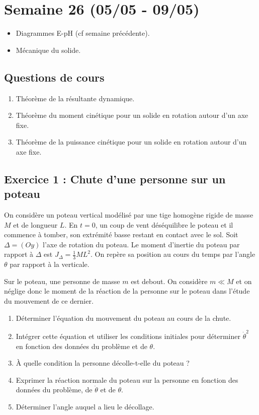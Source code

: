 \section{Semaine 26 (05/05 - 09/05) }


\begin{itemize}
	\item Diagrammes E-pH (cf semaine précédente).
	\item Mécanique du solide.
\end{itemize}

\subsection{Questions de cours}

\begin{enumerate}
	\item Théorème de la résultante dynamique.
	\item Théorème du moment cinétique pour un solide en rotation autour d'un axe fixe.
	\item Théorème de la puissance cinétique pour un solide en rotation autour d'un axe fixe.
\end{enumerate}


\subsection{Exercice 1 : Chute d'une personne sur un poteau}

On considère un poteau vertical modélisé par une tige homogène rigide de masse $M$ et de longueur $L$. En $t=0$, un coup de vent déséquilibre le poteau et il commence à tomber, son extrémité basse restant en contact avec le sol. Soit $\Delta = (Oy)$ l'axe de rotation du poteau. Le moment d'inertie du poteau par rapport à $\Delta$ est $J_{\Delta} = \frac{1}{3}ML^2$. On repère sa position au cours du temps par l'angle $\theta$ par rapport à la verticale. 

Sur le poteau, une personne de masse $m$ est debout. On considère $m \ll M$ et on néglige donc le moment de la réaction de la personne sur le poteau dans l'étude du mouvement de ce dernier. 

\begin{enumerate}
	\item Déterminer l'équation du mouvement du poteau au cours de la chute.
	\item Intégrer cette équation et utiliser les conditions initiales pour déterminer $\dot{\theta}^2$ en fonction des données du problème et de $\theta$.
	\item À quelle condition la personne décolle-t-elle du poteau ?
	\item Exprimer la réaction normale du poteau sur la personne en fonction des données du problème, de $\dot{\theta}$ et de $\theta$.
	\item Déterminer l'angle auquel a lieu le décollage.
\end{enumerate}

